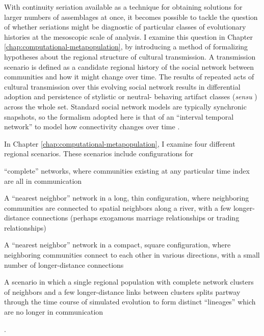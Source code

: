 With continuity seriation available as a technique for obtaining solutions for larger numbers of assemblages at once, it becomes possible to tackle the question of whether seriations might be diagnostic of particular classes of evolutionary histories at the mesoscopic scale of analysis.  I examine this question in Chapter \ref{chap:computational-metapopulation}, by introducing a method of formalizing hypotheses about the regional structure of cultural transmission.  A transmission scenario is defined as a candidate regional history of the social network between communities and how it might change over time.  The results of repeated acts of cultural transmission over this evolving social network results in differential adoption and persistence of stylistic or neutral- behaving artifact classes (\emph{sensu} \citealt{Dunnell1978}) across the whole set. Standard social network models are typically synchronic snapshots, so the formalism adopted here is that of an ``interval temporal network'' to model how connectivity changes over time \citep{Holme2012}. 

In Chapter \ref{chap:computational-metapopulation}, I examine four different regional scenarios. These scenarios include configurations for \begin{dissparalist}
\item ``complete'' networks, where communities existing at any particular time index are all in communication
\item A ``nearest neighbor'' network in a long, thin configuration, where neighboring communities are connected to spatial neighbors along a river, with a few longer-distance connections (perhaps exogamous marriage relationships or trading relationships)
\item A ``nearest neighbor'' network in a compact, square configuration, where neighboring communities connect to each other in various directions, with a small number of longer-distance connections
\item A scenario in which a single regional population with complete network clusters of neighbors and a few longer-distance links between clusters splits partway through the time course of simulated evolution to form distinct ``lineages'' which are no longer in communication
\end{dissparalist}.


